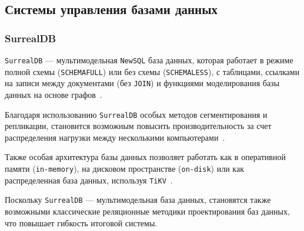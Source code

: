 
\subsection{Системы управления базами данных}

%
%

\subsubsection{SurrealDB}

\texttt{SurrealDB} --- мультимодельная \texttt{NewSQL} база данных, которая работает в режиме полной схемы (\texttt{SCHEMAFULL}) или без схемы (\texttt{SCHEMALESS}), с таблицами, ссылками на записи между документами (без \texttt{JOIN}) и функциями моделирования базы данных на основе графов~\cite{surrealdb}.

Благодаря использованию \texttt{SurrealDB} особых методов сегментирования и репликации, становится возможным повысить производительность за счет распределения нагрузки между несколькими компьютерами~\cite{surrealarch}.

Также особая архитектура базы данных позволяет работать как в оперативной памяти (\texttt{in-memory}), на дисковом пространстве (\texttt{on-disk}) или как распределенная база данных, используя \texttt{TiKV}~\cite{tikv}.

Поскольку \texttt{SurrealDB} --- мультимодельная база данных, становятся также возможными классические реляционные методики проектирования баз данных, что повышает гибкость итоговой системы.

